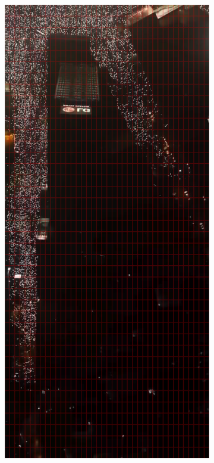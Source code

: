 \documentclass[a4paper,12pt]{article}
\begin{document}
\begin{figure}[H]
	\begin{subfigure}[b]{0.3\textwidth}
	  \centering
	  \includegraphics[width=\textwidth]{../grid_output/makenzijeva_grid.png}

\end{subfigure}
\end{figure}
\end{document}
